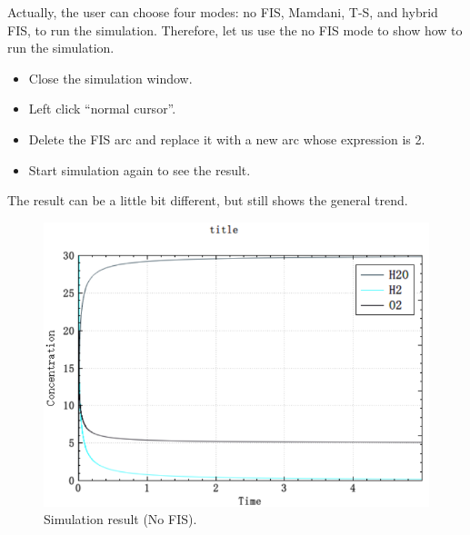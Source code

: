\documentclass[journal,a4paper,onecolumn]{article}
\begin{document}
Actually, the user can choose four modes: no FIS, Mamdani, T-S, and hybrid FIS, to run the simulation. Therefore, let us use the no FIS mode to show how to run the simulation. 

\begin{itemize}
	\item Close the simulation window.
	\item Left click ``normal cursor''.
	\item Delete the FIS arc and replace it with a new arc whose expression is 2.
	\item Start simulation again to see the result.
\end{itemize}

The result can be a little bit different, but still shows the general trend.

\begin{figure}[!hbt]
	\begin{center}
		\includegraphics[width=\columnwidth]{fig15}
		\caption{Simulation result (No FIS).}
		\label{fig:Simulation result (No FIS)}
	\end{center}
\end{figure}
\end{document}
